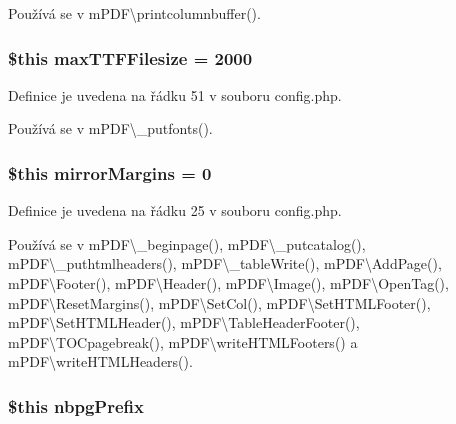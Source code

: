 Používá se v m\-P\-D\-F\textbackslash{}printcolumnbuffer().

\hypertarget{config_8php_a6cdbd21236605c9a7584dd5ec3fcc8bd}{
\subsubsection[{max\-T\-T\-F\-Filesize}]{\setlength{\rightskip}{0pt plus 5cm}\$this max\-T\-T\-F\-Filesize = 2000}}\label{config_8php_a6cdbd21236605c9a7584dd5ec3fcc8bd}


Definice je uvedena na řádku 51 v souboru config.\-php.



Používá se v m\-P\-D\-F\textbackslash{}\-\_\-putfonts().

\hypertarget{config_8php_aa59c8abfc07e5650f35f9c872bd88a43}{
\subsubsection[{mirror\-Margins}]{\setlength{\rightskip}{0pt plus 5cm}\$this mirror\-Margins = 0}}\label{config_8php_aa59c8abfc07e5650f35f9c872bd88a43}


Definice je uvedena na řádku 25 v souboru config.\-php.



Používá se v m\-P\-D\-F\textbackslash{}\-\_\-beginpage(), m\-P\-D\-F\textbackslash{}\-\_\-putcatalog(), m\-P\-D\-F\textbackslash{}\-\_\-puthtmlheaders(), m\-P\-D\-F\textbackslash{}\-\_\-table\-Write(), m\-P\-D\-F\textbackslash{}\-Add\-Page(), m\-P\-D\-F\textbackslash{}\-Footer(), m\-P\-D\-F\textbackslash{}\-Header(), m\-P\-D\-F\textbackslash{}\-Image(), m\-P\-D\-F\textbackslash{}\-Open\-Tag(), m\-P\-D\-F\textbackslash{}\-Reset\-Margins(), m\-P\-D\-F\textbackslash{}\-Set\-Col(), m\-P\-D\-F\textbackslash{}\-Set\-H\-T\-M\-L\-Footer(), m\-P\-D\-F\textbackslash{}\-Set\-H\-T\-M\-L\-Header(), m\-P\-D\-F\textbackslash{}\-Table\-Header\-Footer(), m\-P\-D\-F\textbackslash{}\-T\-O\-Cpagebreak(), m\-P\-D\-F\textbackslash{}write\-H\-T\-M\-L\-Footers() a m\-P\-D\-F\textbackslash{}write\-H\-T\-M\-L\-Headers().

\hypertarget{config_8php_a5d0a0b5b9133bbb6e297644fdabb44b5}{
\subsubsection[{nbpg\-Prefix}]{\setlength{\rightskip}{0pt plus 5cm}\$this nbpg\-Prefix}}\label{config_8php_a5d0a0b5b9133bbb6e297644fdabb44b5}


